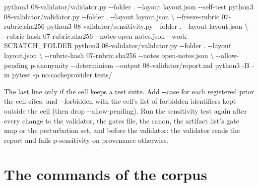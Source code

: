 \documentclass[
  american,
  10pt,
]{report}
\newenvironment{Shaded}{\begin{snugshade}}{\end{snugshade}}
\newcommand{\AttributeTok}[1]{\textcolor[rgb]{0.13,0.29,0.53}{#1}}
\newcommand{\DataTypeTok}[1]{\textcolor[rgb]{0.13,0.29,0.53}{#1}}
\newcommand{\ExtensionTok}[1]{#1}
\newcommand{\NormalTok}[1]{#1}
\renewenvironment{Shaded}{%
  \def\FrameCommand{{\color{rulecolor}\vrule width 2pt}\hspace{6pt}\colorbox{shadecolor}}%
  \MakeFramed{\advance\hsize-\width\FrameRestore}\small}%
  {\endMakeFramed}
\renewcommand{\texttt}[1]{{\ttfamily\hyphenchar\font=-1 #1}}
\begin{document}
\begin{Shaded}
\begin{Highlighting}[]
\ExtensionTok{python3}\NormalTok{ 08{-}validator/validator.py }\AttributeTok{{-}{-}folder}\NormalTok{ . }\AttributeTok{{-}{-}layout}\NormalTok{ layout.json }\AttributeTok{{-}{-}self{-}test}
\ExtensionTok{python3}\NormalTok{ 08{-}validator/validator.py }\AttributeTok{{-}{-}folder}\NormalTok{ . }\AttributeTok{{-}{-}layout}\NormalTok{ layout.json }\DataTypeTok{\textbackslash{}}
    \AttributeTok{{-}{-}freeze{-}rubric}\NormalTok{ 07{-}rubric.sha256}
\ExtensionTok{python3}\NormalTok{ 08{-}validator/sensitivity.py }\AttributeTok{{-}{-}folder}\NormalTok{ . }\AttributeTok{{-}{-}layout}\NormalTok{ layout.json }\DataTypeTok{\textbackslash{}}
    \AttributeTok{{-}{-}rubric{-}hash}\NormalTok{ 07{-}rubric.sha256 }\AttributeTok{{-}{-}notes}\NormalTok{ open{-}notes.json }\AttributeTok{{-}{-}work}\NormalTok{ SCRATCH\_FOLDER}
\ExtensionTok{python3}\NormalTok{ 08{-}validator/validator.py }\AttributeTok{{-}{-}folder}\NormalTok{ . }\AttributeTok{{-}{-}layout}\NormalTok{ layout.json }\DataTypeTok{\textbackslash{}}
    \AttributeTok{{-}{-}rubric{-}hash}\NormalTok{ 07{-}rubric.sha256 }\AttributeTok{{-}{-}notes}\NormalTok{ open{-}notes.json }\DataTypeTok{\textbackslash{}}
    \AttributeTok{{-}{-}allow{-}pending}\NormalTok{ p{-}anonymity }\AttributeTok{{-}{-}determinism} \AttributeTok{{-}{-}output}\NormalTok{ 08{-}validator/report.md}
\ExtensionTok{python3} \AttributeTok{{-}B} \AttributeTok{{-}m}\NormalTok{ pytest }\AttributeTok{{-}p}\NormalTok{ no:cacheprovider tests/}
\end{Highlighting}
\end{Shaded}

The last line only if the cell keeps a test suite. Add
\texttt{-\allowbreak{}-\allowbreak{}case} for each registered prior the
cell cites, and \texttt{-\allowbreak{}-\allowbreak{}forbidden} with the
cell's list of forbidden identifiers kept outside the cell (then drop
\texttt{-\allowbreak{}-\allowbreak{}allow-\allowbreak{}pending}). Run
the sensitivity test again after every change to the validator, the
gates file, the canon, the artifact list's gate map or the perturbation
set, and before the validator: the validator reads the report and fails
\texttt{p-\allowbreak{}sensitivity} on provenance otherwise.

\section{The commands of the corpus}\label{the-commands-of-the-corpus}
\end{document}
